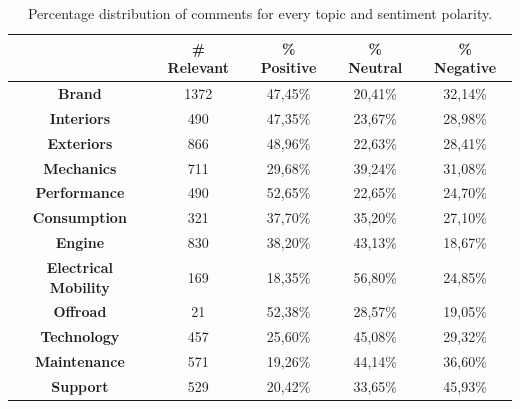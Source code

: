 \begin{table}[ht]
	\renewcommand{\arraystretch}{1.5}
	\centering
	\begin{tabular}{| c | c | c | c | c |} 
		\hline
		& \textbf{\# Relevant} & \textbf{\% Positive} & \textbf{\% Neutral} & \textbf{\% Negative} \\ [.06cm]
		\hline
		\hline
		\textbf{Brand}& 1372 & 47,45\% & 20,41\% & 32,14\% \\ [.06cm]
		\hline
		\textbf{Interiors}& 490 & 47,35\% & 23,67\% & 28,98\% \\ [.06cm]
		\hline
		\textbf{Exteriors}& 866 & 48,96\% & 22,63\% & 28,41\%  \\ [.06cm]
		\hline
		\textbf{Mechanics}& 711 & 29,68\% & 39,24\% & 31,08\% \\ [.06cm]
		\hline
		\textbf{Performance}& 490 & 52,65\% & 22,65\% & 24,70\% \\ [.06cm]
		\hline
		\textbf{Consumption}& 321 & 37,70\% & 35,20\% & 27,10\% \\ [.06cm]
		\hline
		\textbf{Engine}& 830 & 38,20\% & 43,13\% & 18,67\% \\ [.06cm]
		\hline
		\textbf{Electrical Mobility}& 169 & 18,35\% & 56,80\% & 24,85\% \\ [.06cm]
		\hline
		\textbf{Offroad}& 21 & 52,38\% & 28,57\% & 19,05\% \\ [.06cm]
		\hline
		\textbf{Technology}& 457 & 25,60\% & 45,08\% & 29,32\% \\ [.06cm]
		\hline
		\textbf{Maintenance}& 571 & 19,26\% & 44,14\% & 36,60\% \\ [.06cm]
		\hline
		\textbf{Support}& 529 & 20,42\% & 33,65\% & 45,93\% \\ [.06cm]
		\hline
		
	\end{tabular}
	\caption{Percentage distribution of comments for every topic and sentiment polarity.}
	\label{table:annotations-distribution-perc-rel}
\end{table}



